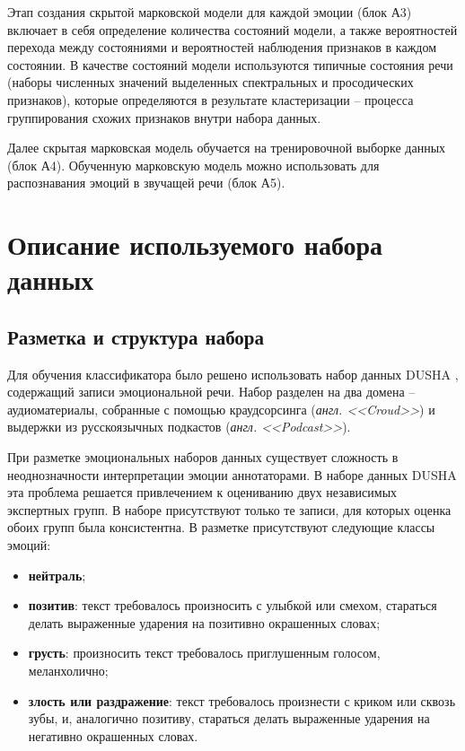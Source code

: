 Этап создания скрытой марковской модели для каждой эмоции (блок А3) включает в себя определение количества состояний модели, а также вероятностей перехода между состояниями и вероятностей наблюдения признаков в каждом состоянии. В качестве состояний модели используются типичные состояния речи (наборы численных значений выделенных спектральных и просодических признаков), которые определяются в результате кластеризации -- процесса группирования схожих признаков внутри набора данных.

Далее скрытая марковская модель обучается на тренировочной выборке данных (блок А4). Обученную марковскую модель можно использовать для распознавания эмоций в звучащей речи (блок А5).
%

\section{Описание используемого набора данных}
\subsection{Разметка и структура набора}
Для обучения классификатора было решено использовать набор данных DUSHA \cite{dusha}, содержащий записи эмоциональной речи. Набор разделен на два домена -- аудиоматериалы, собранные с помощью краудсорсинга (\textit{англ. <<Croud>>}) и выдержки из русскоязычных подкастов (\textit{англ. <<Podcast>>}). 

При разметке эмоциональных наборов данных существует сложность в неоднозначности интерпретации эмоции аннотаторами. В наборе данных DUSHA эта проблема решается привлечением к оцениванию двух независимых экспертных групп. В наборе присутствуют только те записи, для которых оценка обоих групп была консистентна. В разметке присутствуют следующие классы эмоций: 
\begin{itemize}
	\item \textbf{нейтраль};
	\item \textbf{позитив}: текст требовалось произносить с улыбкой или смехом, стараться делать выраженные ударения на позитивно окрашенных словах;
	\item \textbf{грусть}: произносить текст требовалось приглушенным голосом, меланхолично;
	\item \textbf{злость или раздражение}: текст требовалось произнести с криком или сквозь зубы, и, аналогично позитиву, стараться делать выраженные ударения на негативно окрашенных словах.
\end{itemize}


